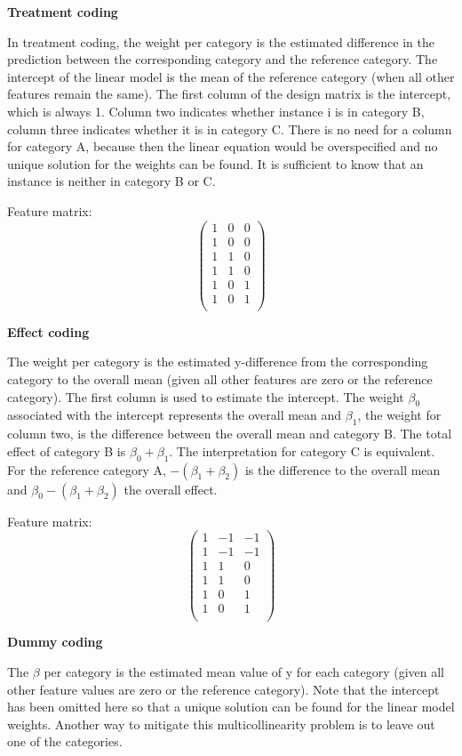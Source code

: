 \documentclass[
  10pt,
]{scrbook}
\begin{document}
\textbf{Treatment coding}

In treatment coding, the weight per category is the estimated difference in the prediction between the corresponding category and the reference category.
The intercept of the linear model is the mean of the reference category (when all other features remain the same).
The first column of the design matrix is the intercept, which is always 1.
Column two indicates whether instance i is in category B, column three indicates whether it is in category C.
There is no need for a column for category A, because then the linear equation would be overspecified and no unique solution for the weights can be found.
It is sufficient to know that an instance is neither in category B or C.

Feature matrix: \[\begin{pmatrix}1&0&0\\1&0&0\\1&1&0\\1&1&0\\1&0&1\\1&0&1\\\end{pmatrix}\]

\textbf{Effect coding}

The weight per category is the estimated y-difference from the corresponding category to the overall mean (given all other features are zero or the reference category).
The first column is used to estimate the intercept.
The weight \(\beta_{0}\) associated with the intercept represents the overall mean and \(\beta_{1}\), the weight for column two, is the difference between the overall mean and category B.
The total effect of category B is \(\beta_{0}+\beta_{1}\).
The interpretation for category C is equivalent.
For the reference category A, \(-(\beta_{1}+\beta_{2})\) is the difference to the overall mean and \(\beta_{0}-(\beta_{1}+\beta_{2})\) the overall effect.

Feature matrix: \[\begin{pmatrix}1&-1&-1\\1&-1&-1\\1&1&0\\1&1&0\\1&0&1\\1&0&1\\\end{pmatrix}\]

\textbf{Dummy coding}

The \(\beta\) per category is the estimated mean value of y for each category (given all other feature values are zero or the reference category).
Note that the intercept has been omitted here so that a unique solution can be found for the linear model weights.
Another way to mitigate this multicollinearity problem is to leave out one of the categories.
\end{document}
